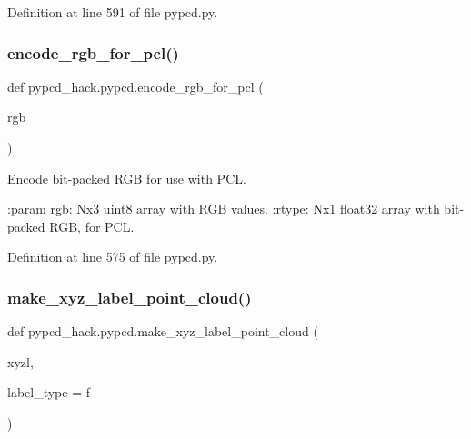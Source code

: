 Definition at line 591 of file pypcd.\+py.

\mbox{\label{namespacepypcd__hack_1_1pypcd_aeb5d9633c49c1c7c6d456301fbb75a43}} 
\subsubsection{\texorpdfstring{encode\+\_\+rgb\+\_\+for\+\_\+pcl()}{encode\_rgb\_for\_pcl()}}
{\footnotesize\ttfamily def pypcd\+\_\+hack.\+pypcd.\+encode\+\_\+rgb\+\_\+for\+\_\+pcl (\begin{DoxyParamCaption}\item[{}]{rgb }\end{DoxyParamCaption})}

\begin{DoxyVerb}Encode bit-packed RGB for use with PCL.

:param rgb: Nx3 uint8 array with RGB values.
:rtype: Nx1 float32 array with bit-packed RGB, for PCL.
\end{DoxyVerb}
 

Definition at line 575 of file pypcd.\+py.

\mbox{\label{namespacepypcd__hack_1_1pypcd_ac1b992c24065b93d4330e8b22478579e}} 
\subsubsection{\texorpdfstring{make\+\_\+xyz\+\_\+label\+\_\+point\+\_\+cloud()}{make\_xyz\_label\_point\_cloud()}}
{\footnotesize\ttfamily def pypcd\+\_\+hack.\+pypcd.\+make\+\_\+xyz\+\_\+label\+\_\+point\+\_\+cloud (\begin{DoxyParamCaption}\item[{}]{xyzl,  }\item[{}]{label\+\_\+type = {\ttfamily \textquotesingle{}f\textquotesingle{}} }\end{DoxyParamCaption})}

